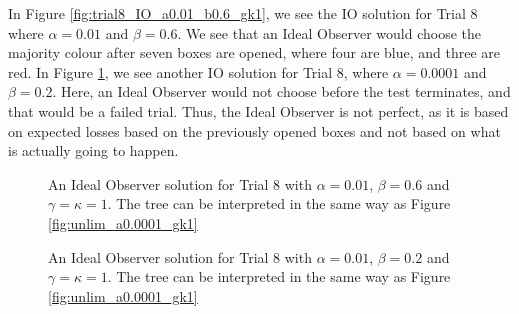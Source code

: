In Figure \ref{fig:trial8_IO_a0.01_b0.6_gk1}, we see the IO solution for Trial 8 where $\alpha=0.01$ and $\beta=0.6$. We see that an Ideal Observer would choose the majority colour after seven boxes are opened, where four are blue, and three are red. In Figure \ref{fig:trial8_IO_a0.0001_b0.2_gk1}, we see another IO solution for Trial 8, where $\alpha=0.0001$ and $\beta=0.2$. Here, an Ideal Observer would not choose before the test terminates, and that would be a failed trial. Thus, the Ideal Observer is not perfect, as it is based on expected losses based on the previously opened boxes and not based on what is actually going to happen.
\begin{figure}
    \centering
     \begin{minipage}[t]{0.45\textwidth}
        \centering
        \scalebox{0.7}{}
        \caption[IO solution, Trial 8. $\alpha=0.01$, $\beta=0.6$ and $\gamma=\kappa=1$.]{An Ideal Observer solution for Trial 8 with $\alpha=0.01$, $\beta=0.6$ and $\gamma=\kappa=1$. The tree can be interpreted in the same way as Figure \ref{fig:unlim_a0.0001_gk1}}
        \label{fig:trial8_IO_a0.01_b0.6_gk1}
     \end{minipage}\hfill
     \begin{minipage}[t]{0.45\textwidth}
        \centering
        \scalebox{0.7}{}
        \caption[IO solution, Trial 8. $\alpha=0.0001$, $\beta=0.2$ and $\gamma=\kappa=1$.]{An Ideal Observer solution for Trial 8 with $\alpha=0.01$, $\beta=0.2$ and $\gamma=\kappa=1$. The tree can be interpreted in the same way as Figure \ref{fig:unlim_a0.0001_gk1}}
        \label{fig:trial8_IO_a0.0001_b0.2_gk1}
     \end{minipage}
\end{figure}





